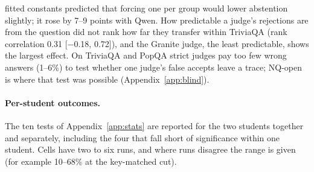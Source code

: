 fitted constants predicted that forcing one \idk{} per group would lower abstention slightly; it rose by 7--9 points with Qwen. How predictable a judge's rejections are from the question did not rank how far they transfer within TriviaQA (rank correlation 0.31 [$-$0.18, 0.72]), and the Granite judge, the least predictable, shows the largest effect. On TriviaQA and PopQA strict judges pay too few wrong answers (1--6\%) to test whether one judge's false accepts leave a trace; NQ-open is where that test was possible (Appendix~\ref{app:blind}).

\paragraph{Per-student outcomes.} The ten tests of Appendix~\ref{app:stats} are reported for the two students together and separately, including the four that fall short of significance within one student. Cells have two to six runs, and where runs disagree the range is given (for example 10--68\% at the key-matched cut).
